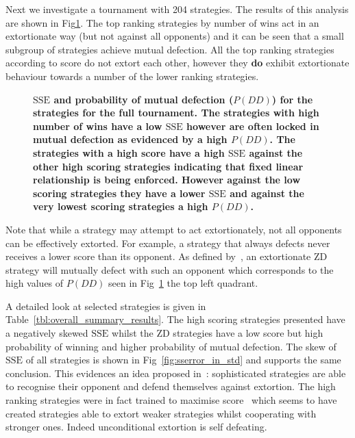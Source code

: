 \documentclass[10pt,letterpaper]{article}
\newcommand{\SSe}{\text{SSE}}
\begin{document}
Next we investigate a tournament with
204 strategies. The results of
this analysis are shown in Fig\ref{fig:sse_chi_probabilities_in_full}. The
top ranking strategies by number of wins act in an extortionate way (but not
against all opponents) and it can be seen that a small subgroup of strategies
achieve mutual defection.  All the top ranking strategies according to score
do not extort each other, however they
\textbf{do} exhibit extortionate behaviour towards a number of the lower ranking
strategies.

\begin{figure}[!htbp]
    \centering
    \caption{{\bf \(\SSe\) and probability of mutual defection (\(P(DD)\)) 
        for the strategies for
        the full tournament. The strategies with high number of wins
        have a low \(\SSe\) however are often locked in mutual defection as
        evidenced by a high \(P(DD)\). The strategies with a high score
        have a high \(\SSe\) against the other high scoring strategies
        indicating that fixed linear relationship is being enforced. However
        against the low scoring strategies they have a lower \(\SSe\) and
        against the very lowest scoring strategies a high \(P(DD)\).}}
    \label{fig:sse_chi_probabilities_in_full}
\end{figure}

Note that while a strategy may attempt to act extortionately, not all opponents
can be effectively extorted. For example, a strategy that always defects never
receives a lower score than its opponent. As defined by~\cite{Press2012}, an
extortionate ZD strategy will mutually defect with such an opponent which
corresponds to the high values of \(P(DD)\) seen in
Fig~\ref{fig:sse_chi_probabilities_in_full} the top left quadrant.

A detailed look at selected strategies is given in
Table~\ref{tbl:overall_summary_results}. The high scoring strategies presented
have a negatively skewed \(\SSe\) whilst the ZD strategies have a low score but
high probability of winning and higher probability of mutual defection.
The skew of \(\SSe\) of all strategies is shown in
Fig~\ref{fig:sserror_in_std} and supports the
same conclusion. This evidences an idea proposed
in~\cite{adami2013evolutionary}: sophisticated strategies are able to recognise
their opponent and defend themselves against extortion.  The high ranking
strategies were in fact trained to maximise score~\cite{Harper2017} which seems
to have created strategies able to extort weaker strategies whilst cooperating
with stronger ones. Indeed unconditional extortion is self defeating.
\end{document}
